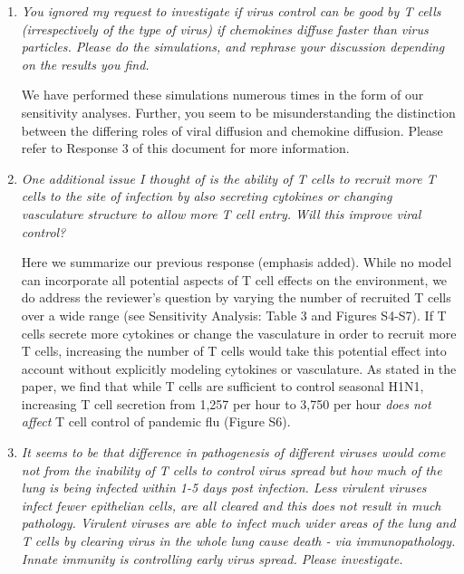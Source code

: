 \documentclass[10pt]{article}
\newenvironment{response}{\fontfamily{cmr}}{\par}
\begin{document}
\begin{enumerate}
\begin{response}
\begin{enumerate}
\item \textit{You ignored my request to investigate if virus control can be good by T cells (irrespectively of the type of virus) if chemokines diffuse faster than virus particles. Please do the simulations, and rephrase your discussion depending on the results you find.}
\begin{displayquote}
We have performed these simulations numerous times in the form of our sensitivity analyses.  Further, you seem to be misunderstanding the distinction between the differing roles of viral diffusion and chemokine diffusion.  Please refer to Response 3 of this document for more information.
\end{displayquote}

\item \textit{One additional issue I thought of is the ability of T cells to recruit more T cells to the site of infection by also secreting cytokines or changing vasculature structure to allow more T cell entry. Will this improve viral control?}

\begin{displayquote}
Here we summarize our previous response (emphasis added). While no model can incorporate all potential aspects of T cell effects on the environment, we do address the reviewer’s question by varying the number of recruited T cells over a wide range (see Sensitivity Analysis: Table 3 and Figures S4-S7). If T cells secrete more cytokines or change the vasculature in order to recruit more T cells, increasing the number of T cells would take this potential effect into account without explicitly modeling cytokines or vasculature. As stated in the paper, we find that while T cells are sufficient to control seasonal H1N1, increasing T cell secretion from 1,257 per hour to 3,750 per hour \emph{does not affect} T cell control of pandemic flu (Figure S6).
\end{displayquote}

\item \textit{It seems to be that difference in pathogenesis of different viruses would come not from the inability of T cells to control virus spread but how much of the lung is being infected within 1-5 days post infection. Less virulent viruses infect fewer epithelian cells, are all cleared and this does not result in much pathology. Virulent viruses are able to infect much wider areas of the lung and T cells by clearing virus in the whole lung cause death - via immunopathology. Innate immunity is controlling early virus spread. Please investigate.}


\end{enumerate}
\end{response}
\end{enumerate}
\end{document}

